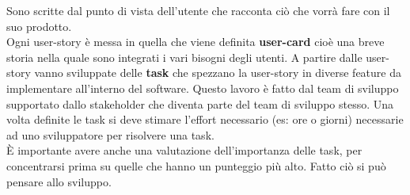 Sono scritte dal punto di vista dell'utente che racconta ciò che vorrà fare con il suo prodotto.\\
Ogni user-story è messa in quella che viene definita \textbf{user-card} cioè una breve storia nella quale sono integrati i vari bisogni degli utenti.
A partire dalle user-story vanno sviluppate delle \textbf{task} che spezzano la user-story in diverse feature da implementare all'interno del software.
Questo lavoro è fatto dal team di sviluppo supportato dallo stakeholder che diventa parte del team di sviluppo stesso.
Una volta definite le task si deve stimare l'effort necessario (es: ore o giorni) necessarie ad uno sviluppatore per risolvere una task.\\
È importante avere anche una valutazione dell'importanza delle task, per concentrarsi prima su quelle che hanno un punteggio più alto.
Fatto ciò si può pensare allo sviluppo.

